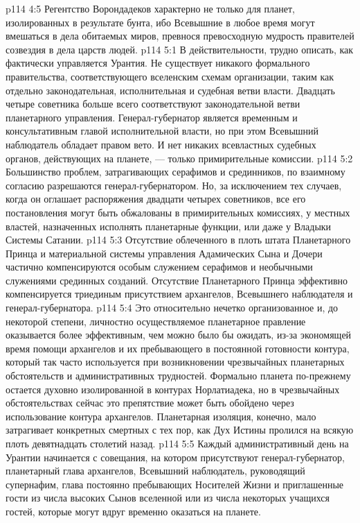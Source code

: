 \vs p114 4:5 Регентство Ворондадеков характерно не только для планет, изолированных в результате бунта, ибо Всевышние в любое время могут вмешаться в дела обитаемых миров, превнося превосходную мудрость правителей созвездия в дела царств людей.
\vs p114 5:1 В действительности, трудно описать, как фактически управляется Урантия. Не существует никакого формального правительства, соответствующего вселенским схемам организации, таким как отдельно законодательная, исполнительная и судебная ветви власти. Двадцать четыре советника больше всего соответствуют законодательной ветви планетарного управления. Генерал\hyp{}губернатор является временным и консультативным главой исполнительной власти, но при этом Всевышний наблюдатель обладает правом вето. И нет никаких всевластных судебных органов, действующих на планете, --- только примирительные комиссии.
\vs p114 5:2 Большинство проблем, затрагивающих серафимов и срединников, по взаимному согласию разрешаются генерал\hyp{}губернатором. Но, за исключением тех случаев, когда он оглашает распоряжения двадцати четырех советников, все его постановления могут быть обжалованы в примирительных комиссиях, у местных властей, назначенных исполнять планетарные функции, или даже у Владыки Системы Сатании.
\vs p114 5:3 Отсутствие облеченного в плоть штата Планетарного Принца и материальной системы управления Адамических Сына и Дочери частично компенсируются особым служением серафимов и необычными служениями срединных созданий. Отсутствие Планетарного Принца эффективно компенсируется триединым присутствием архангелов, Всевышнего наблюдателя и генерал\hyp{}губернатора.
\vs p114 5:4 Это относительно нечетко организованное и, до некоторой степени, личностно осуществляемое планетарное правление оказывается более эффективным, чем можно было бы ожидать, из\hyp{}за экономящей время помощи архангелов и их пребывающего в постоянной готовности контура, который так часто используется при возникновении чрезвычайных планетарных обстоятельств и административных трудностей. Формально планета по\hyp{}прежнему остается духовно изолированной в контурах Норлатиадека, но в чрезвычайных обстоятельствах сейчас это препятствие может быть обойдено через использование контура архангелов. Планетарная изоляция, конечно, мало затрагивает конкретных смертных с тех пор, как Дух Истины пролился на всякую плоть девятнадцать столетий назад.
\vs p114 5:5 \pc Каждый административный день на Урантии начинается с совещания, на котором присутствуют генерал\hyp{}губернатор, планетарный глава архангелов, Всевышний наблюдатель, руководящий супернафим, глава постоянно пребывающих Носителей Жизни и приглашенные гости из числа высоких Сынов вселенной или из числа некоторых учащихся гостей, которые могут вдруг временно оказаться на планете.
